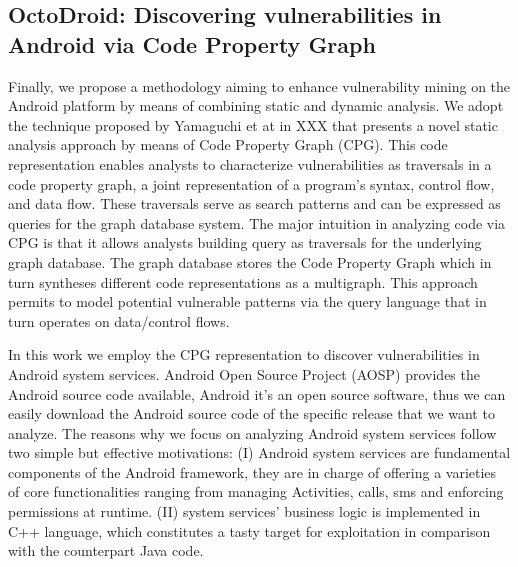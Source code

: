\subsection{OctoDroid: Discovering vulnerabilities in Android via Code Property Graph}

Finally, we propose a methodology aiming to enhance vulnerability mining on the Android platform by means of combining static and dynamic analysis. 
We adopt the technique proposed by Yamaguchi et at in XXX that presents a novel static analysis approach by means of Code Property Graph (CPG). This code representation enables analysts to characterize vulnerabilities as traversals in a code property graph, a joint representation of a program’s syntax, control flow, and data flow. These traversals serve as search patterns and can be expressed as queries for the graph database system. The major intuition in analyzing code via CPG is that it allows analysts building query as traversals for the underlying graph database. The graph database stores the Code Property Graph which in turn syntheses different code representations as a multigraph. This approach permits to model  potential vulnerable patterns via the query language that in turn operates on data/control flows.


In this work we employ the CPG representation to discover vulnerabilities in Android system services. Android Open Source Project (AOSP) provides the Android source code available, Android it's an open source software, thus we can easily download the Android source code of the specific release that we want to analyze.  The reasons why we focus on analyzing Android system services follow two simple but effective motivations: (I) Android system services are fundamental components of the Android framework, they are in charge of offering a varieties of core functionalities ranging from managing Activities, calls, sms and enforcing permissions at runtime. (II) system services' business logic is implemented in C++ language, which constitutes a tasty target for exploitation in comparison with the counterpart Java code.

